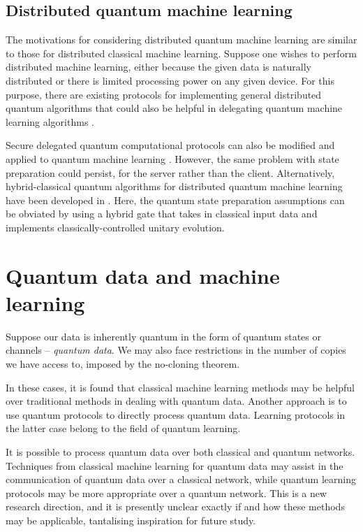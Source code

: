 \documentclass[twocolumn, aps, rmp, amsmath, amssymb, nofootinbib, superscriptaddress, longbibliography, floatfix, table-of-contents, eqsecnum]{revtex4}
\begin{document}
\subsection{Distributed quantum machine learning}

The motivations for considering distributed quantum machine learning are similar to those for distributed classical machine learning. Suppose one wishes to perform distributed machine learning, either because the given data is naturally distributed or there is limited processing power on any given device. For this purpose, there are existing protocols for implementing general distributed quantum algorithms that could also be helpful in delegating quantum machine learning algorithms \cite{bib:beals2013efficient}.

Secure delegated quantum computational protocols \cite{bib:joe} can also be modified and applied to quantum machine learning \cite{bib:sheng2017distributed, bib:bang2015protocol}. However, the same problem with state preparation could persist, for the server rather than the client. Alternatively, hybrid-classical quantum algorithms for distributed quantum machine learning have been developed in \cite{bib:yoo2014quantum}. Here, the quantum state preparation assumptions can be obviated by using a hybrid gate that takes in classical input data and implements classically-controlled unitary evolution.

\section{Quantum data and machine learning} \label{sec:sec4}

Suppose our data is inherently quantum in the form of quantum states or channels -- \textit{quantum data}. We may also face restrictions in the number of copies we have access to, imposed by the no-cloning theorem.

In these cases, it is found that classical machine learning methods may be helpful over traditional methods in dealing with quantum data. Another approach is to use quantum protocols to directly process quantum data. Learning protocols in the latter case belong to the field of quantum learning.

It is possible to process quantum data over both classical and quantum networks. Techniques from classical machine learning for quantum data may assist in the communication of quantum data over a classical network, while quantum learning protocols may be more appropriate over a quantum network. This is a new research direction, and it is presently unclear exactly if and how these methods may be applicable, tantalising inspiration for future study.
\end{document}
